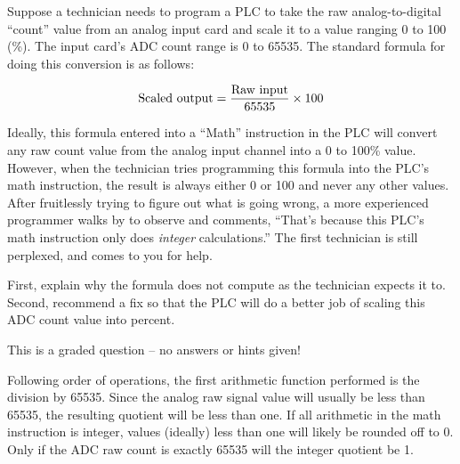 

Suppose a technician needs to program a PLC to take the raw analog-to-digital ``count'' value from an analog input card and scale it to a value ranging 0 to 100 (\%).  The input card's ADC count range is 0 to 65535.  The standard formula for doing this conversion is as follows:

$$\hbox{Scaled output} = {\hbox{Raw input} \over 65535} \times 100$$

Ideally, this formula entered into a ``Math'' instruction in the PLC will convert any raw count value from the analog input channel into a 0 to 100\% value.  However, when the technician tries programming this formula into the PLC's math instruction, the result is always either 0 or 100 and never any other values.  After fruitlessly trying to figure out what is going wrong, a more experienced programmer walks by to observe and comments, ``That's because this PLC's math instruction only does {\it integer} calculations.''  The first technician is still perplexed, and comes to you for help.  

\vskip 10pt

First, explain why the formula does not compute as the technician expects it to.  Second, recommend a fix so that the PLC will do a better job of scaling this ADC count value into percent.

\vfil

\eject






This is a graded question -- no answers or hints given!







Following order of operations, the first arithmetic function performed is the division by 65535.  Since the analog raw signal value will usually be less than 65535, the resulting quotient will be less than one.  If all arithmetic in the math instruction is integer, values (ideally) less than one will likely be rounded off to 0.  Only if the ADC raw count is exactly 65535 will the integer quotient be 1.

